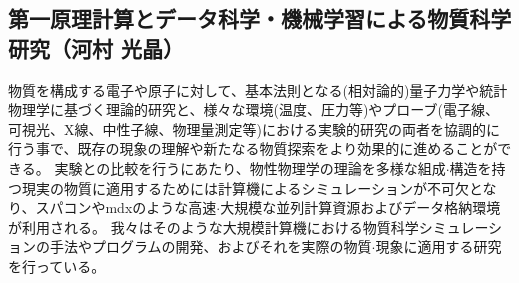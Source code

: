\subsection{第一原理計算とデータ科学・機械学習による物質科学研究（河村 光晶）}

物質を構成する電子や原子に対して、基本法則となる(相対論的)量子力学や統計物理学に基づく理論的研究と、様々な環境(温度、圧力等)やプローブ(電子線、可視光、X線、中性子線、物理量測定等)における実験的研究の両者を協調的に行う事で、既存の現象の理解や新たなる物質探索をより効果的に進めることができる。
実験との比較を行うにあたり、物性物理学の理論を多様な組成$\cdot$構造を持つ現実の物質に適用するためには計算機によるシミュレーションが不可欠となり、スパコンやmdxのような高速$\cdot$大規模な並列計算資源およびデータ格納環境が利用される。
我々はそのような大規模計算機における物質科学シミュレーションの手法やプログラムの開発、およびそれを実際の物質$\cdot$現象に適用する研究を行っている。
